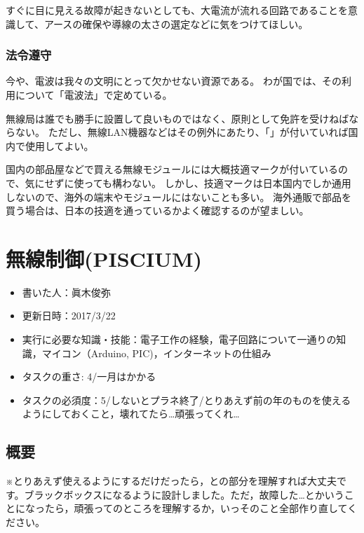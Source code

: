 \documentclass[letterpaper,10pt,dvipdfmx]{sphinxmanual}
\begin{document}
すぐに目に見える故障が起きないとしても、大電流が流れる回路であることを意識して、アースの確保や導線の太さの選定などに気をつけてほしい。


\subsection{法令遵守}
\label{\detokenize{wireless/wireless:id16}}
今や、電波は我々の文明にとって欠かせない資源である。
わが国では、その利用について「電波法」で定めている。

無線局は誰でも勝手に設置して良いものではなく、原則として免許を受けねばならない。
ただし、無線LAN機器などはその例外にあたり、「」が付いていれば国内で使用してよい。

国内の部品屋などで買える無線モジュールには大概技適マークが付いているので、気にせずに使っても構わない。
しかし、技適マークは日本国内でしか通用しないので、海外の端末やモジュールにはないことも多い。
海外通販で部品を買う場合は、日本の技適を通っているかよく確認するのが望ましい。


\chapter{無線制御(PISCIUM)}
\label{\detokenize{wireless/piscium::doc}}\label{\detokenize{wireless/piscium:piscium}}\begin{itemize}
\item {} 
書いた人：眞木俊弥

\item {} 
更新日時：2017/3/22

\item {} 
実行に必要な知識・技能：電子工作の経験，電子回路について一通りの知識，マイコン（Arduino,
PIC)，インターネットの仕組み

\item {} 
タスクの重さ: 4/一月はかかる

\item {} 
タスクの必須度：5/しないとプラネ終了/とりあえず前の年のものを使えるようにしておくこと，壊れてたら…頑張ってくれ…

\end{itemize}


\section{概要}
\label{\detokenize{wireless/piscium:id1}}
※とりあえず使えるようにするだけだったら，との部分を理解すれば大丈夫です。ブラックボックスになるように設計しました。ただ，故障した…とかいうことになったら，頑張ってのところを理解するか，いっそのこと全部作り直してください。
\end{document}
